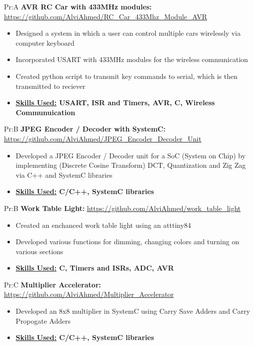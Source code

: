 \documentclass[11pt]{article}
\newcommand{\spaces}{1em}
\begin{document}
 
Pr:A
\vspace{\spaces}
\textbf{AVR RC Car with 433MHz modules: }
\underline{\url{https://github.com/AlviAhmed/RC_Car_433Mhz_Module_AVR}}
\begin{itemize}[noitemsep,nolistsep]
\item Designed a system in which a user can control multiple cars wirelessly
  via computer keyboard
\item Incorporated USART with 433MHz modules for the wireless communication
\item Created python script to transmit key commands to serial, which is then transmitted to reciever
\item \textbf{\underline{Skills Used:} USART, ISR and Timers, AVR, C, Wireless Communuication }
\end{itemize} 

 
 
Pr:B
\vspace{\spaces}
\textbf{JPEG Encoder / Decoder with SystemC: }
\underline{\url{https://github.com/AlviAhmed/JPEG_Encoder_Decoder_Unit}}
\begin{itemize}[noitemsep,nolistsep]
\item Developed a JPEG Encoder / Decoder unit for a SoC (System on Chip) by implementing
  (Discrete Cosine Transform) DCT, Quantization and Zig Zag via C++ and SystemC libraries
\item \textbf{\underline{Skills Used:} C/C++, SystemC libraries}
\end{itemize} 

 
Pr:B
\vspace{\spaces}
\textbf{Work Table Light: }
\underline{\url{https://github.com/AlviAhmed/work_table_light}}
\begin{itemize}[noitemsep,nolistsep]
\item Created an enchanced work table light using an atttiny84
\item Developed various functions for dimming, changing colors and turning on various sections 
\item \textbf{ \underline{Skills Used:} C, Timers and ISRs, ADC, AVR}
\end{itemize} 

 
 
Pr:C
\vspace{\spaces}
\textbf{Multiplier Accelerator: }
\underline{\url{https://github.com/AlviAhmed/Multiplier_Accelerator}}
\begin{itemize}[noitemsep,nolistsep]
\item Developed an 8x8 multiplier in SystemC using Carry Save Adders and Carry Propogate Adders
\item \textbf{\underline{Skills Used:} C/C++, SystemC libraries}
\end{itemize} 
\end{document}
